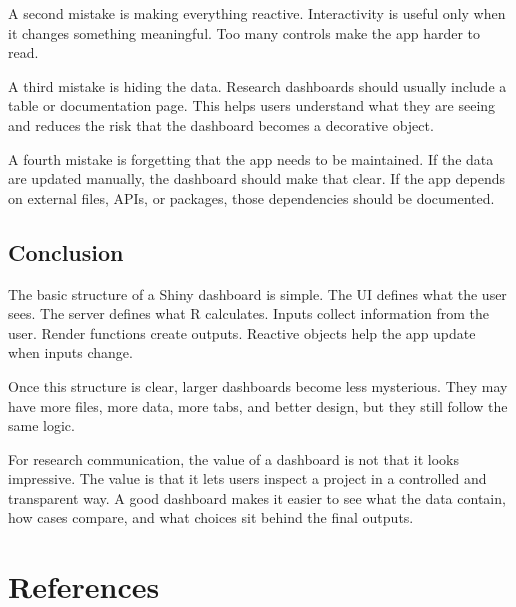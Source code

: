 \documentclass[
  letterpaper,
  DIV=11,
  numbers=noendperiod]{scrreprt}
\begin{document}
A second mistake is making everything reactive. Interactivity is useful
only when it changes something meaningful. Too many controls make the
app harder to read.

A third mistake is hiding the data. Research dashboards should usually
include a table or documentation page. This helps users understand what
they are seeing and reduces the risk that the dashboard becomes a
decorative object.

A fourth mistake is forgetting that the app needs to be maintained. If
the data are updated manually, the dashboard should make that clear. If
the app depends on external files, APIs, or packages, those dependencies
should be documented.

\section{Conclusion}\label{conclusion-1}

The basic structure of a Shiny dashboard is simple. The UI defines what
the user sees. The server defines what R calculates. Inputs collect
information from the user. Render functions create outputs. Reactive
objects help the app update when inputs change.

Once this structure is clear, larger dashboards become less mysterious.
They may have more files, more data, more tabs, and better design, but
they still follow the same logic.

For research communication, the value of a dashboard is not that it
looks impressive. The value is that it lets users inspect a project in a
controlled and transparent way. A good dashboard makes it easier to see
what the data contain, how cases compare, and what choices sit behind
the final outputs.


\chapter*{References}\label{references}

\end{document}
